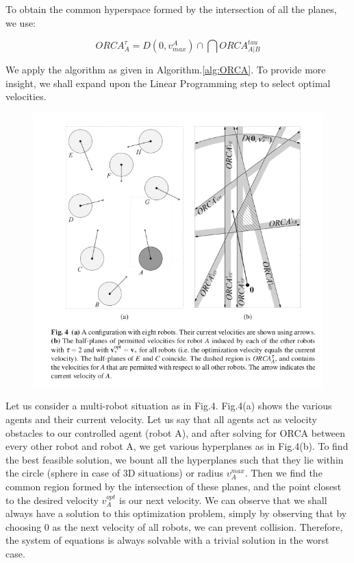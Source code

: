 \documentclass[12pt]{report}
\begin{document}
To obtain the common hyperspace formed by the intersection of all the planes, we use:

\begin{equation}\label{eq:update}
ORCA^{\tau}_{A} = D(0,v^{A}_{max}) \cap \bigcap ORCA^{tau}_{A|B}
\end{equation}

We apply the algorithm as given in Algorithm.\ref{alg:ORCA}. To provide more insight, we shall expand upon the Linear Programming step to select optimal velocities.

\begin{figure}[h]
	\centering
	\includegraphics[scale=0.6]{Algo.png}  \label{fig:algo}
\end{figure}

Let us consider a multi-robot situation as in Fig.4. Fig.4(a) shows the various agents and their current velocity. Let us say that all agents act as velocity obstacles to our controlled agent (robot A), and after solving for ORCA between every other robot and robot A, we get various hyperplanes as in Fig.4(b). To find the best feasible solution, we bount all the hyperplanes such that they lie within the circle (sphere in case of 3D situations) or radius $v^{max}_{A}$. Then we find the common region formed by the intersection of these planes, and the point closest to the desired velocity $v^{opt}_{A}$ is our next velocity. We can observe that we shall always have a solution to this optimization problem, simply by observing that by choosing 0 as the next velocity of all robots, we can prevent collision. Therefore, the system of equations is always solvable with a trivial solution in the worst case.
\end{document}
